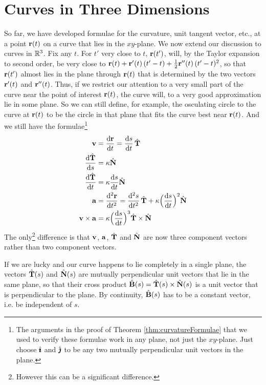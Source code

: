\section{Curves in Three Dimensions}\label{sec:Curve3d}
So far, we have developed formulae for the curvature, unit tangent vector,
etc., at a point $\mathbf{r}(t)$ on a curve that lies in the $xy$-plane. We 
now extend our discussion to curves in $\mathbb{R}^3$. Fix any $t$.
For $t'$ very close to $t$, $\mathbf{r}(t')$, will, by the Taylor expansion 
to second order, be very close to $\mathbf{r}(t) + \mathbf{r}'(t)\,(t'-t) 
+\frac{1}{2}\mathbf{r}''(t)\,(t'-t)^2$, so that $\mathbf{r}(t')$ almost lies in the 
plane through $\mathbf{r}(t)$ that is determined by the two vectors $\mathbf{r}'(t)$ and 
$\mathbf{r}''(t)$. Thus, if we restrict
our attention to a very small part of the curve near the point of 
interest $\mathbf{r}(t)$, the curve will, to a very good approximation lie in 
some plane. So we can still define, for example, the osculating circle 
to the curve at $\mathbf{r}(t)$ to be the circle in that plane that fits the 
curve best near $\mathbf{r}(t)$. And we still have the formulae\footnote{The arguments in the proof of Theorem \ref{thm:curvatureFormulae} that we used to verify 
these formulae work in any plane, not just the $xy$-plane. Just choose 
$\hat{\pmb{\imath}}$ and $\hat{\pmb{\jmath}}$ to be any two mutually perpendicular unit vectors in the plane.}
\begin{align*}
\vv&=\diff{\vr}{t}=\diff{s}{t}\,\hat\vT\\
\diff{\hat\vT}{s} &= \ka\hat\vN\\
\diff{\hat\vT}{t} &= \ka\diff{s}{t}\hat\vN\\
\va&=\difftwo{\vr}{t}=\difftwo{s}{t}\,\hat\vT
                             +\ka\Big(\diff{s}{t}\Big)^2\hat\vN\\
\vv\times\va &= \ka \Big(\diff{s}{t}\Big)^3\hat\vT\times\hat\vN
\end{align*}
The only\footnote{However this can be a significant difference.} 
difference is that $\mathbf{v}$, $\mathbf{a}$, $\hat{\mathbf{T}}$ and $\hat{\mathbf{N}}$
are now three component vectors rather than two component vectors. 

If we are lucky and our curve happens to lie completely in a single plane, 
the vectors $\hat{\mathbf{T}}(s)$ and $\hat{\mathbf{N}}(s)$ are mutually perpendicular 
unit vectors that lie in the same plane, so that their cross product
$\hat{\mathbf{B}}(s) = \hat{\mathbf{T}}(s)\times\hat{\mathbf{N}}(s)$
is a unit vector that is perpendicular to the plane.  By continuity, 
$\hat{\mathbf{B}}(s)$ has to be a constant vector, i.e. be independent of $s$. 

